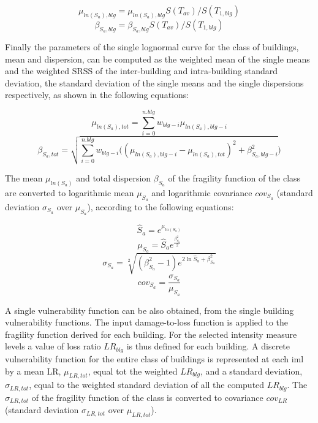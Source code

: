 \begin{equation}
\mu_{ln(S_a), blg} = \mu_{ln(S_a), blg} S(T_{av})/ S(T_{1, blg})
\end{equation}
\begin{equation}
\beta_{S_a, blg} = \beta_{S_a, blg} S(T_{av})/ S(T_{1, blg})
\label{eq:Sa(Tav)}
\end{equation}

Finally the parameters of the single lognormal curve for the class of buildings, mean and dispersion, can be computed as the weighted mean of the single means and the weighted SRSS of the inter-building and intra-building standard deviation, the standard deviation of the single means and the single dispersions respectively, as shown in the following equations:

\begin{equation}
\mu_{ln(S_a), tot} = \sum_{i=0}^{n.blg} w_{blg-i} \mu_{ln(S_a), blg-i}
\label{eq:combination-lognormals-mu}
\end{equation}
\begin{equation}
\beta_{S_a, tot} = \sqrt{ \sum_{i=0}^{n.blg} w_{blg-i} ((\mu_{ln(S_a), blg-i}-\mu_{ln(S_a), tot})^2+ \beta_{S_a, blg-i}^2})
\label{eq:combination-lognormals-sigma}
\end{equation}

The mean $\mu_{ln(S_a)}$ and total dispersion $\beta_{S_a}$ of the fragility function of the class are converted to logarithmic mean $\mu_{S_a}$ and logarithmic covariance $cov_{S_a}$ (standard deviation $\sigma_{S_a}$ over $\mu_{S_a}$), according to the following equations:

\begin{equation}
\hat{S}_a = e^{\mu_{ln(S_a)}}
\end{equation}
\begin{equation}
\mu_{S_a} = \hat{S}_a e^{\frac{\beta_{S_a}^2}{2}}
\label{eq:median-to-mean}
\end{equation}
\begin{equation}
\sigma_{S_a} = \sqrt[2]{(\beta_{S_a}^2-1) e^{2\ln{ \hat{S}_a}+\beta_{S_a}^2}}
\label{eq:dispersion-to-standard}
\end{equation}
\begin{equation}
cov_{S_a} = \frac{\sigma_{S_a}}{\mu_{S_a} }
\end{equation}

A single vulnerability function can be also obtained, from the single building vulnerability functions. The input damage-to-loss function is applied to the fragility function derived for each building. For the selected intensity measure levels a value of loss ratio $LR_{blg}$ is thus defined for each building. A discrete vulnerability function for the entire class of buildings is represented at each iml by a mean LR, $\mu_{LR,tot}$, equal tot the weighted $LR_{blg}$, and a standard deviation, $\sigma_{LR, tot}$, equal to the weighted standard deviation of all the computed $LR_{blg}$. The $\sigma_{LR, tot}$ of the fragility function of the class is converted to covariance $cov_{LR}$ (standard deviation $\sigma_{LR, tot}$ over $\mu_{LR, tot}$).

